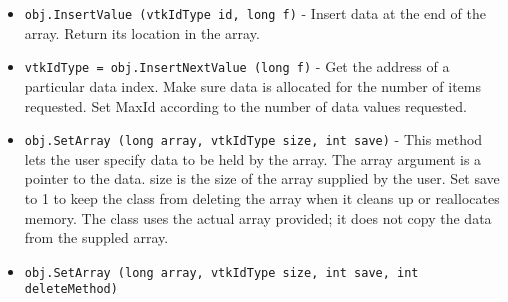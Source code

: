 \begin{itemize}
\item  \verb|obj.InsertValue (vtkIdType id, long f)| -  Insert data at the end of the array. Return its location in the array.

\item  \verb|vtkIdType = obj.InsertNextValue (long f)| -  Get the address of a particular data index. Make sure data is allocated
 for the number of items requested. Set MaxId according to the number of
 data values requested.

\item  \verb|obj.SetArray (long array, vtkIdType size, int save)| -  This method lets the user specify data to be held by the array.  The
 array argument is a pointer to the data.  size is the size of
 the array supplied by the user.  Set save to 1 to keep the class
 from deleting the array when it cleans up or reallocates memory.
 The class uses the actual array provided; it does not copy the data
 from the suppled array. 

\item  \verb|obj.SetArray (long array, vtkIdType size, int save, int deleteMethod)|

\end{itemize}
